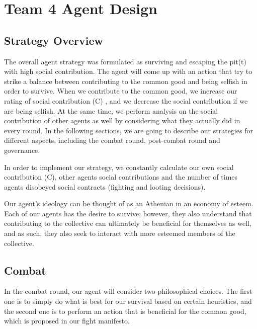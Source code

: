 \chapter{Team 4 Agent Design}\label{team_4_agent_design}

\section{Strategy Overview}

\par The overall agent strategy was formulated as surviving and escaping the pit(t) with high social contribution. The agent will come up with an action that try to strike a balance between contributing to the common good and being selfish in order to survive. When we contribute to the common good, we increase our rating of social contribution (C) , and we decrease the social contribution if we are being selfish. At the same time, we perform analysis on the social contribution of other agents as well by considering what they actually did in every round. In the following sections, we are going to describe our strategies for different aspects, including the combat round, post-combat round and governance.

\par In order to implement our strategy, we constantly calculate our own social contribution (C), other agents social contributions and the number of times agents disobeyed social contracts (fighting and looting decisions).

\par Our agent's ideology can be thought of as an Athenian in an economy of esteem. Each of our agents has the desire to survive; however, they also understand that contributing to the collective can ultimately be beneficial for themselves as well, and as such,
they also seek to interact with more esteemed members of the collective. 

\section{Combat}

\par In the combat round, our agent will consider two philosophical choices. The first one is to simply do what is best for our survival based on certain heuristics, and the second one is to perform an action that is beneficial for the common good, which is proposed in our fight manifesto.

